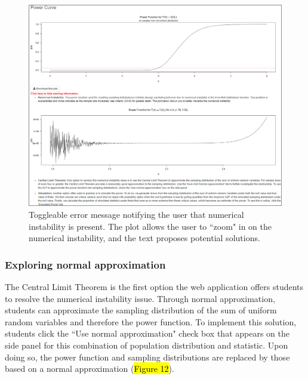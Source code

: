 \documentclass{TISE}
\begin{document}
\begin{figure}[H]
	\centering
	\includegraphics[width=\textwidth]{irwinerror.png}
	\caption{Toggleable error message notifying the user that numerical instability is present. The plot allows the user to ``zoom" in on the numerical instability, and the text proposes potential solutions.}
\end{figure}

\subsubsection{Exploring normal approximation}

The Central Limit Theorem is the first option the web application offers students to resolve the numerical instability issue. Through normal approximation, students can approximate the sampling distribution of the sum of uniform random variables and therefore the power function. To implement this solution, students click the ``Use normal approximation" check box that appears on the side panel for this combination of population distribution and statistic. Upon doing so, the power function and sampling distributions are replaced by those based on a normal approximation (\hl{Figure 12}).

\newpage
\end{document}
